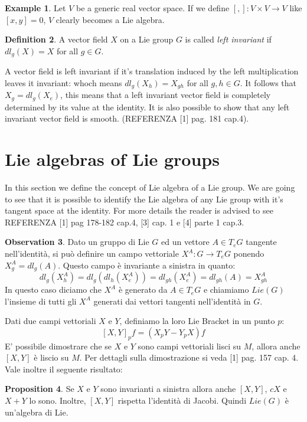 \documentclass[12pt,a4paper]{report}
\theoremstyle{definition}
\newtheorem{Def}{Definition}[chapter]
\theoremstyle{Theorem}
\newtheorem{Prop}[Def]{Proposition}
\theoremstyle{definition}
\newtheorem{Ex}[Def]{Example}
\theoremstyle{definition}
\newtheorem{Obs}[Def]{Observation}
\begin{document}
		\begin{Ex}
			Let $V$ be a generic real vector space. If we define $[,]:V\times V\rightarrow V$ like $[x,y]=0$, $V$ clearly becomes a Lie algebra.
		\end{Ex}
		\begin{Def}
			A vector field $X$ on a Lie group $G$ is called \textit{left invariant} if $dl_g(X)=X$ for all $g\in G$.
		\end{Def}
		A vector field is left invariant if it's translation induced by the left multiplication leaves it invariant: whoch means $dl_g(X_h)=X_{gh}$ for all $g,h\in G$.
		It follows that $X_g=dl_g(X_e)$, this means that a left invariant vector field is completely determined by its value at the identity. It is also possible to show that any left invariant vector field is smooth. (REFERENZA [1] pag. 181 cap.4).
		\section{Lie algebras of Lie groups}
		In this section we define the concept of Lie algebra of a Lie group. We are going to see that it is possible to identify the Lie algebra of any Lie group with it's tangent space at the identity. For more details the reader is advised to see REFERENZA [1] pag 178-182 cap.4, [3] cap. 1 e [4] parte 1 cap.3.
		\begin{Obs} \label{Obs: 2.2}
			Dato un gruppo di Lie $G$ ed un vettore $A\in T_eG$ tangente nell'identità, si può definire un campo vettoriale $X^A:G\rightarrow T_eG$ ponendo $X^A_g=dl_g(A)$. Questo campo è invariante a sinistra in quanto: $$dl_g(X^A_h)=dl_g(dl_h(X^A_e))=dl_{gh}(X^A_e)=dl_{gh}(A)=X^A_{gh}$$
			In questo caso diciamo che $X^A$ è generato da $A\in T_eG$ e chiamiamo $Lie(G)$ l'insieme di tutti gli $X^A$ generati dai vettori tangenti nell'identità in $G$.	
		\end{Obs}
		Dati due campi vettoriali $X$ e $Y$, definiamo la loro Lie Bracket in un punto $p$:
		$$[X,Y]_pf=(X_pY-Y_pX)f$$
		E' possibile dimostrare che se $X$ e $Y$ sono campi vettoriali lisci su $M$, allora anche $[X,Y]$ è liscio su $M$. Per dettagli sulla dimostrazione si veda [1] pag. 157 cap. 4.
		Vale inoltre il seguente risultato:
		\begin{Prop}
			Se $X$ e $Y$ sono invarianti a sinistra allora anche $[X,Y]$, $cX$ e $X+Y$ lo sono. Inoltre, $[X,Y]$ rispetta l'identità di Jacobi. Quindi $Lie(G)$ è un'algebra di Lie.
		\end{Prop}
\end{document}
